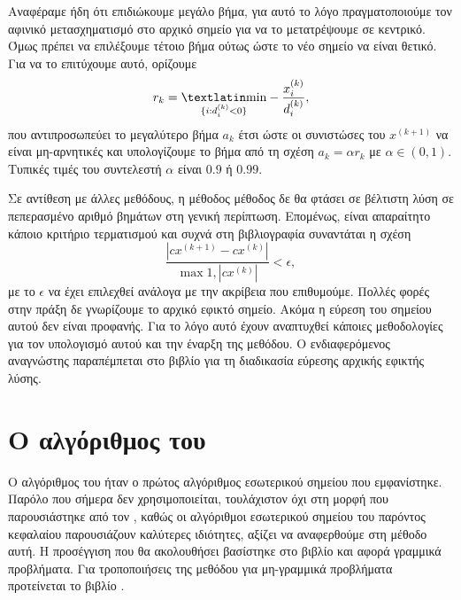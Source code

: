 Αναφέραμε ήδη ότι επιδιώκουμε μεγάλο βήμα, για αυτό το λόγο πραγματοποιούμε τον
αφινικό μετασχηματισμό στο αρχικό σημείο για να το μετατρέψουμε σε κεντρικό.
Όμως πρέπει να επιλέξουμε τέτοιο βήμα ούτως ώστε το νέο σημείο να είναι θετικό.
Για να το επιτύχουμε αυτό, ορίζουμε
\begin{equation*}
    r_k = \underset{\{i: d_i^{(k)} < 0\}} {\text{\tl{min}}}
    -\frac{x^{(k)}_i}{d^{(k)}_i},
\end{equation*}
που αντιπροσωπεύει το μεγαλύτερο βήμα \( a_k \) έτσι ώστε οι συνιστώσες του
\( x^{(k+1)} \) να είναι μη-αρνητικές και υπολογίζουμε το βήμα από τη σχέση
\( a_k = \alpha r_k \) με \( \alpha \in (0, 1) \). Τυπικές τιμές του συντελεστή
\( \alpha \) είναι \(0.9\) ή \(0.99\).

Σε αντίθεση με άλλες μεθόδους, η μέθοδος  μέθοδος δε θα
φτάσει σε βέλτιστη λύση σε πεπερασμένο αριθμό βημάτων στη γενική περίπτωση.
Επομένως, είναι απαραίτητο κάποιο κριτήριο τερματισμού και συχνά στη
βιβλιογραφία συναντάται η σχέση
\begin{equation*}
    \frac{ | cx^{(k+1)} - cx^{(k)} |} {\max{1, |cx^{(k)}|}} < \epsilon,
\end{equation*}
με το \( \epsilon \) να έχει επιλεχθεί ανάλογα με την ακρίβεια που επιθυμούμε.
Πολλές φορές στην πράξη δε γνωρίζουμε το αρχικό εφικτό σημείο. Ακόμα η εύρεση
του σημείου αυτού δεν είναι προφανής. Για το λόγο αυτό έχουν αναπτυχθεί κάποιες
μεθοδολογίες για τον υπολογισμό αυτού και την έναρξη της μεθόδου. Ο
ενδιαφερόμενος αναγνώστης παραπέμπεται στο βιβλίο \cite{chong2010} για τη
διαδικασία εύρεσης αρχικής εφικτής λύσης.

\section{Ο αλγόριθμος του }
Ο αλγόριθμος του  ήταν ο πρώτος αλγόριθμος εσωτερικού σημείου που
εμφανίστηκε. Παρόλο που σήμερα δεν χρησιμοποιείται, τουλάχιστον όχι στη μορφή
που παρουσιάστηκε από τον , καθώς οι αλγόριθμοι
εσωτερικού σημείου του παρόντος κεφαλαίου παρουσιάζουν
καλύτερες ιδιότητες, αξίζει να αναφερθούμε στη μέθοδο αυτή. Η προσέγγιση
που θα ακολουθήσει βασίστηκε στο βιβλίο \cite{chong2010} και αφορά γραμμικά
προβλήματα. Για τροποποιήσεις της μεθόδου για μη-γραμμικά προβλήματα προτείνεται
το βιβλίο \cite{nesterov1994interior}.

